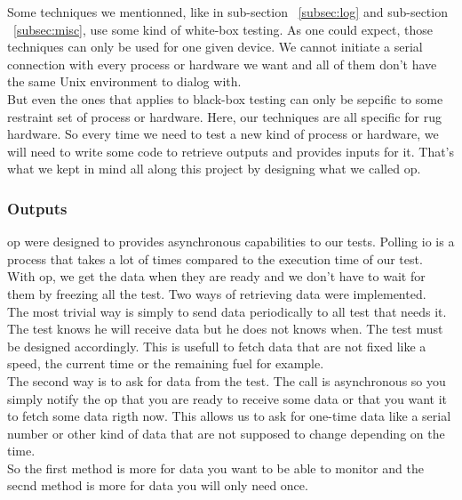 \documentclass[12pt]{article}
\begin{document}
Some techniques we mentionned, like in sub-section ~\ref{subsec:log} and sub-section ~\ref{subsec:misc}, use some kind of white-box testing. As one could expect, those techniques can only be used for one given device. We cannot initiate a serial connection with every process or hardware we want and all of them don't have the same Unix environment to dialog with.\\

But even the ones that applies to black-box testing can only be sepcific to some restraint set of process or hardware. Here, our techniques are all specific for \gls{rug} hardware. So every time we need to test a new kind of process or hardware, we will need to write some code to retrieve outputs and provides inputs for it. That's what we kept in mind all along this project by designing what we called \gls{op}.\\

\subsubsection{Outputs}

\gls{op} were designed to provides asynchronous capabilities to our tests. Polling \gls{io} is a process that takes a lot of times compared to the execution time of our test. With \gls{op}, we get the data when they are ready and we don't have to wait for them by freezing all the test. Two ways of retrieving data were implemented.\\

The most trivial way is simply to send data periodically to all test that needs it. The test knows he will receive data but he does not knows when. The test must be designed accordingly. This is usefull to fetch data that are not fixed like a speed, the current time or the remaining fuel for example.\\

The second way is to ask for data from the test. The call is asynchronous so you simply notify the \gls{op} that you are ready to receive some data or that you want it to fetch some data rigth now. This allows us to ask for one-time data like a serial number or other kind of data that are not supposed to change depending on the time.\\

So the first method is more for data you want to be able to monitor and the secnd method is more for data you will only need once.\\
\end{document}
